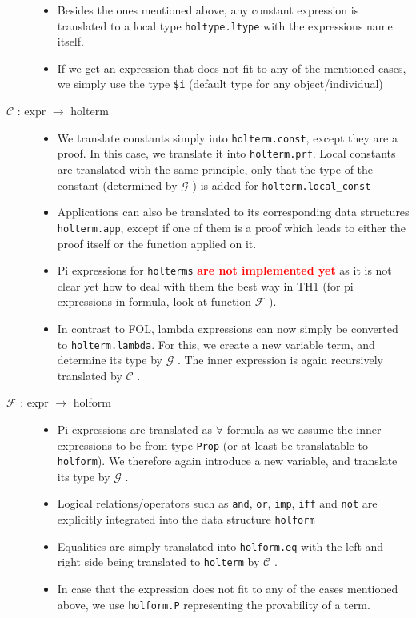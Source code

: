 \documentclass[a4paper]{article}
\newcommand{\TODO}[1]{\textbf{\textcolor{red}{#1}}}
\newcommand{\F}[0]{$\mathcal{F}$ }
\newcommand{\G}[0]{$\mathcal{G}$ }
\newcommand{\C}[0]{$\mathcal{C}$ }
\begin{document}
\begin{description}
\begin{itemize}
		\item Besides the ones mentioned above, any constant expression is translated to a local type \texttt{holtype.ltype} with the expressions name itself. 
		\item If we get an expression that does not fit to any of the mentioned cases, we simply use the type \texttt{\$i} (default type for any object/individual)
	\end{itemize}
	\item[\C: expr $\to$ holterm] \text{ }
	\begin{itemize}
		\item We translate constants simply into \texttt{holterm.const}, except they are a proof. In this case, we translate it into \texttt{holterm.prf}. Local constants are translated with the same principle, only that the type of the constant (determined by \G) is added for \texttt{holterm.local\_const}
		\item Applications can also be translated to its corresponding data structures \texttt{holterm.app}, except if one of them is a proof which leads to either the proof itself or the function applied on it.
		\item Pi expressions for \texttt{holterms} \TODO{are not implemented yet} as it is not clear yet how to deal with them the best way in TH1 (for pi expressions in formula, look at function \F). 
		\item In contrast to FOL, lambda expressions can now simply be converted to \texttt{holterm.lambda}. For this, we create a new variable term, and determine its type by \G. The inner expression is again recursively translated by \C.
	\end{itemize}
	\item[\F: expr $\to$ holform] \text{ }
	\begin{itemize}
		\item Pi expressions are translated as $\forall$ formula as we assume the inner expressions to be from type \texttt{Prop} (or at least be translatable to \texttt{holform}). We therefore again introduce a new variable, and translate its type by \G.
		\item Logical relations/operators such as \texttt{and}, \texttt{or}, \texttt{imp}, \texttt{iff} and \texttt{not} are explicitly integrated into the data structure \texttt{holform}
		\item Equalities are simply translated into \texttt{holform.eq} with the left and right side being translated to \texttt{holterm} by \C.
		\item In case that the expression does not fit to any of the cases mentioned above, we use \texttt{holform.P} representing the provability of a term. 
	\end{itemize}
\end{description}
\end{document}
